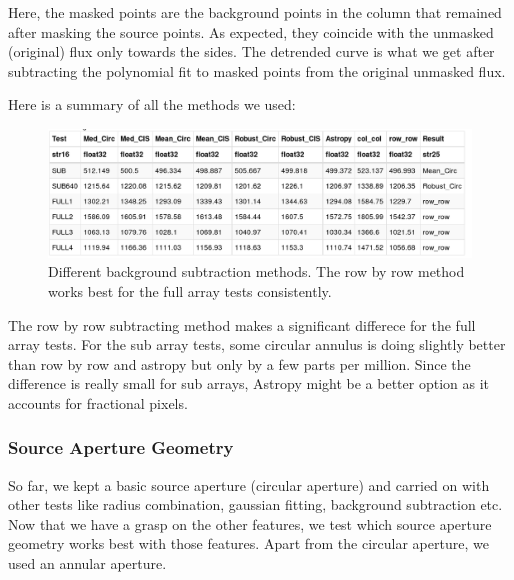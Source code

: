 \documentclass{aastex6}
\begin{document}
        Here, the masked points are the background points in the column that remained after masking the source points. As expected, they coincide with the unmasked (original) flux only towards the sides. The detrended curve is what we get after subtracting the polynomial fit to masked points from the original unmasked flux.
        
        Here is a summary of all the methods we used:
        
        \begin{figure}[H]
            \begin{centering}
            \includegraphics[width=1.0\textwidth]{bkg_sub}
            \caption{Different background subtraction methods. The row by row method works best for the full array tests consistently.}
            \end{centering}
        \end{figure}
        
        The row by row subtracting method makes a significant differece for the full array tests. For the sub array tests, some circular annulus is doing slightly better than row by row and astropy but only by a few parts per million. Since the difference is really small for sub arrays, Astropy might be a better option as it accounts for fractional pixels.\\
        
        
        
        
        \subsubsection{Source Aperture Geometry}
        So far, we kept a basic source aperture (circular aperture) and carried on with other tests like radius combination, gaussian fitting, background subtraction etc. Now that we have a grasp on the other features, we test which source aperture geometry works best with those features. Apart from the circular aperture, we used an annular aperture. \\
        
\end{document}
